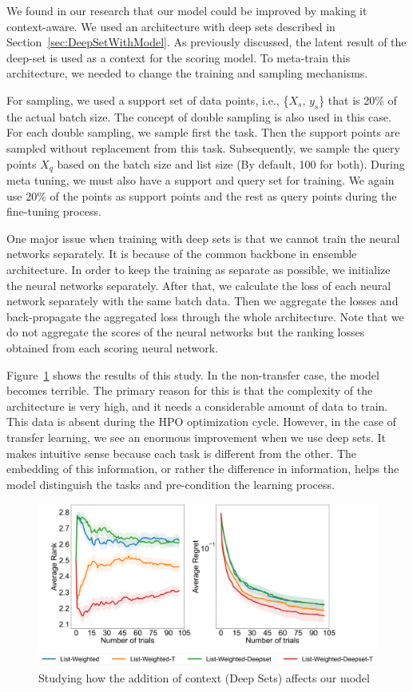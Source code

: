 \documentclass[12pt, twoside, ngerman]{report}
\begin{document}
We found in our research that our model could be improved by making it context-aware. We used an architecture with deep sets described in Section~\ref{sec:DeepSetWithModel}. As previously discussed, the latent result of the deep-set is used as a context for the scoring model. To meta-train this architecture,  we needed to change the training and sampling mechanisms.

For sampling, we used a support set of data points, i.e., \{$X_s$, $y_s$\} that is 20\% of the actual batch size. The concept of double sampling is also used in this case. For each double sampling, we sample first the task.
Then the support points are sampled without replacement from this task.
Subsequently, we sample the query points $X_q$ based on the batch size and list size (By default, 100 for both).
During meta tuning, we must also have a support and query set for training.
We again use 20\% of the points as support points and the rest as query points during the fine-tuning process.

One major issue when training with deep sets is that we cannot train the neural networks separately.
It is because of the common backbone in ensemble architecture.
In order to keep the training as separate as possible, we initialize the neural networks separately. After that, we calculate the loss of each neural network separately with the same batch data. Then we aggregate the losses and back-propagate the aggregated loss through the whole architecture. Note that we do not aggregate the scores of the neural networks but the ranking losses obtained from each scoring neural network.

Figure~\ref{fig:Q3Ablation} shows the results of this study. In the non-transfer case,  the model becomes terrible. The primary reason for this is that the complexity of the architecture is very high, and it needs a considerable amount of data to train. This data is absent during the HPO optimization cycle. However,  in the case of transfer learning,  we see an enormous improvement when we use deep sets. It makes intuitive sense because each task is different from the other. The embedding of this information, or rather the difference in information, helps the model distinguish the tasks and pre-condition the learning process. 

\begin{figure}[h]
  \centering
    \includegraphics[scale=0.25]{images/Q3Ablation}
    \caption{Studying how the addition of context (Deep Sets) affects our model}
    \label{fig:Q3Ablation}
\end{figure}
\end{document}
